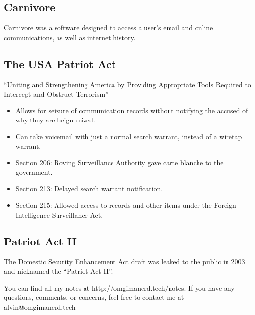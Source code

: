 \documentclass[letterpaper, 12pt]{article}
\begin{document}
\subsection*{Carnivore}
Carnivore was a software designed to access a user's email and online
communications, as well as internet history.

\subsection*{The USA Patriot Act}
``Uniting and Strengthening America by Providing Appropriate Tools Required to
Intercept and Obstruct Terrorism''
\begin{itemize}
  \item Allows for seizure of communication records without notifying the
    accused of why they are beign seized.
  \item Can take voicemail with just a normal search warrant, instead of a
    wiretap warrant.
  \item Section 206: Roving Surveillance Authority gave carte blanche to the
    government.
  \item Section 213: Delayed search warrant notification.
  \item Section 215: Allowed access to records and other items under the
    Foreign Intelligence Surveillance Act.
\end{itemize}

\subsection*{Patriot Act II}
The Domestic Security Enhancement Act draft was leaked to the public in 2003
and nicknamed the ``Patriot Act II''.

\begin{center}
  You can find all my notes at \url{http://omgimanerd.tech/notes}. If you have
  any questions, comments, or concerns, feel free to contact me at
  alvin@omgimanerd.tech
\end{center}
\end{document}
